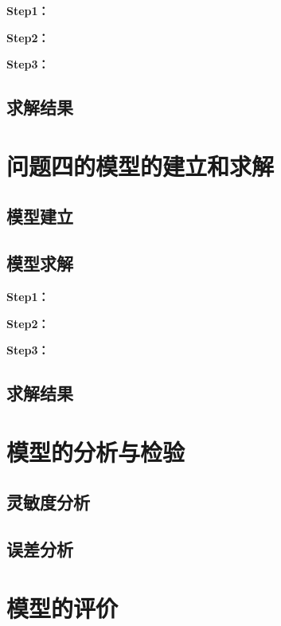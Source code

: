 \documentclass[withoutpreface,bwprint]{cumcmthesis}
\begin{document}
\textbf{Step1：} 

\textbf{Step2：} 

\textbf{Step3：} 

\subsection{求解结果}


\section{问题四的模型的建立和求解}
\subsection{模型建立}

\subsection{模型求解}

\textbf{Step1：} 

\textbf{Step2：} 

\textbf{Step3：} 

\subsection{求解结果}


\section{模型的分析与检验}

\subsection{灵敏度分析}

\subsection{误差分析}


\section{模型的评价}
\end{document}
